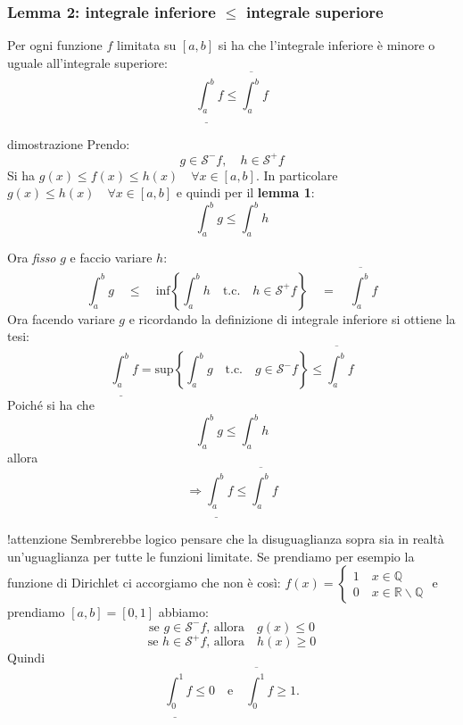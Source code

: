 \documentclass[x11names]{article}
\begin{document}
	\begin{center}
		\colorbox{myred}{\begin{minipage}{5.75in}
				\begin{redes}{}
					\subsubsection{Lemma 2: integrale inferiore $\leq$ integrale superiore}
					Per ogni funzione $f$ limitata su $\left[a,b\right]$ si ha che l'integrale inferiore è minore o uguale all'integrale superiore:
					\[
					\underline{\int_{a}^{b}}f \leq \overline{\int_{a}^{b}}f
					\]
				\end{redes}
		\end{minipage}}        
	\end{center}
	\begin{es}{dimostrazione}
		Prendo:
		\[
		g \in \mathcal{S}^-f, \quad h \in \mathcal{S}^+f
		\]
		Si ha $g(x) \leq f(x) \leq h(x) \quad \forall x \in [a,b]$. In particolare $g(x) \leq h(x) \quad \forall x \in [a,b]$ e quindi per il \textbf{lemma 1}:
		\[
		\int_{a}^{b}g \leq \int_{a}^{b}h 
		\]
		
		Ora \textit{fisso} $g$ e faccio variare $h$:
		\[
		\int_{a}^{b}g \quad \leq \quad \text{inf}\left\{\int_{a}^{b}h \quad \text{t.c.} \quad h \in \mathcal{S}^+f\right\} \quad = \quad \overline{\int_{a}^{b}}f
		\]
		Ora facendo variare $g$ e ricordando la definizione di integrale inferiore si ottiene la tesi:
		\[
		\underline{\int_{a}^{b}}f = \text{sup}\left\{\int_{a}^{b}g \quad \text{t.c.} \quad g \in  \mathcal{S}^-f \right\} \leq \overline{\int_{a}^{b}}f
		\]
		Poiché si ha che 
		\[
		\int_{a}^{b}g \leq \int_{a}^{b}h 
		\]
		allora
		\[
		\Longrightarrow \underline{\int_{a}^{b}}f \leq \overline{\int_{a}^{b}}f
		\]
		
		\begin{es}{!attenzione}
			Sembrerebbe logico pensare che la disuguaglianza sopra sia in realtà un'uguaglianza per tutte le funzioni limitate.
			Se prendiamo per esempio la funzione di Dirichlet ci accorgiamo che non è così: $f(x) = \begin{cases}
				1 \quad x \in \mathbb{Q} \\
				0 \quad x \in \mathbb{R} \backslash \mathbb{Q}
			\end{cases}$
			e prendiamo $[a,b] = [0,1]$ abbiamo:
			\[
			\text{se } g \in \mathcal{S}^-f \text{, allora} \quad g(x) \leq 0
			\]
			\[
			\text{se } h \in \mathcal{S}^+f \text{, allora} \quad h(x) \geq 0
			\]
			Quindi 
			\[
			\underline{\int_{0}^{1}}f \leq 0 \quad \text{e} \quad \overline{\int_{0}^{1}}f \geq 1.
			\]
		\end{es}
	\end{es}
	
\end{document}
